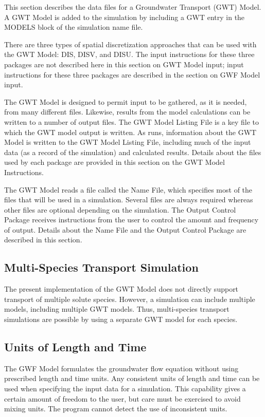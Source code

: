 This section describes the data files for a \mf Groundwater Transport (GWT) Model.  A GWT Model is added to the simulation by including a GWT entry in the MODELS block of the simulation name file.

There are three types of spatial discretization approaches that can be used with the GWT Model: DIS, DISV, and DISU.  The input instructions for these three packages are not described here in this section on GWT Model input; input instructions for these three packages are described in the section on GWF Model input.

The GWT Model is designed to permit input to be gathered, as it is needed, from many different files.  Likewise, results from the model calculations can be written to a number of output files. The GWT Model Listing File is a key file to which the GWT model output is written.  As \mf runs, information about the GWT Model is written to the GWT Model Listing File, including much of the input data (as a record of the simulation) and calculated results.  Details about the files used by each package are provided in this section on the GWT Model Instructions.

The GWT Model reads a file called the Name File, which specifies most of the files that will be used in a simulation. Several files are always required whereas other files are optional depending on the simulation. The Output Control Package receives instructions from the user to control the amount and frequency of output.  Details about the Name File and the Output Control Package are described in this section.

\subsection{Multi-Species Transport Simulation}
The present implementation of the GWT Model does not directly support transport of multiple solute species.  However, a simulation can include multiple models, including multiple GWT models.  Thus, multi-species transport simulations are possible by using a separate GWT model for each species.

\subsection{Units of Length and Time}
The GWF Model formulates the groundwater flow equation without using prescribed length and time units. Any consistent units of length and time can be used when specifying the input data for a simulation. This capability gives a certain amount of freedom to the user, but care must be exercised to avoid mixing units.  The program cannot detect the use of inconsistent units.

